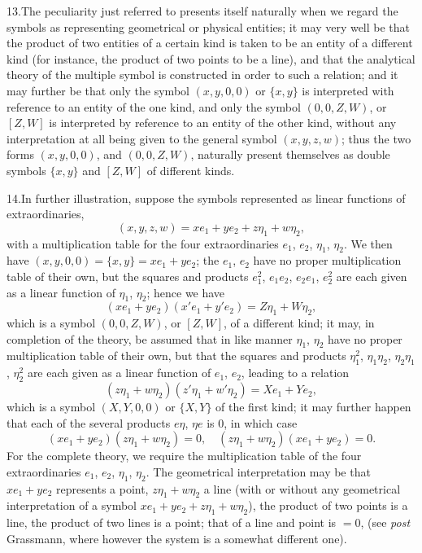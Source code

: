 \documentclass[11pt]{article}
\begin{document}
13.\quad The peculiarity just referred to presents itself naturally when we regard the symbols as representing geometrical or physical entities; it may very well be that the product of two entities of a certain kind is taken to be an entity of a different kind (for instance, the product of two points to be a line), and that the analytical theory of the multiple symbol is constructed in order to such a relation; and it may further be that only the symbol $(x, y, 0, 0)$ or $\{x, y\}$ is interpreted with reference to an entity of the one kind, and only the symbol $(0, 0, Z, W)$, or $[Z, W]$ is interpreted by reference to an entity of the other kind, without any interpretation at all being given to the general symbol $(x, y, z, w)$; thus the two forms $(x, y, 0, 0)$, and $(0, 0, Z, W)$, naturally present themselves as double symbols $\{x, y\}$ and $[Z, W]$ of different kinds.

14.\quad In further illustration, suppose the symbols represented as linear functions of extraordinaries,
\[
(x, y, z, w) = xe_{1} + ye_{2} + z\eta_{1} + w\eta_{2},
\]
with a multiplication table for the four extraordinaries $e_{1}$, $e_{2}$, $\eta_{1}$, $\eta_{2}$. We then have $(x, y, 0, 0) = \{x, y\} = xe_{1} + ye_{2}$; the $e_{1}$, $e_{2}$ have no proper multiplication table of their own, but the squares and products $e_{1}^{2}$, $e_{1}e_{2}$, $e_{2}e_{1}$, $e_{2}^{2}$ are each given as a linear function of $\eta_{1}$, $\eta_{2}$; hence we have
\[
(xe_{1} + ye_{2})(x'e_{1} + y'e_{2}) = Z\eta_{1} + W\eta_{2},
\]
which is a symbol $(0, 0, Z, W)$, or $[Z, W]$, of a different kind; it may, in completion of the theory, be assumed that in like manner $\eta_{1}$, $\eta_{2}$ have no proper multiplication table of their own, but that the squares and products $\eta_{1}^{2}$, $\eta_{1}\eta_{2}$, $\eta_{2}\eta_{1}$, $\eta_{2}^{2}$ are each given as a linear function of $e_{1}$, $e_{2}$, leading to a relation
\[
(z\eta_{1} + w\eta_{2})(z'\eta_{1} + w'\eta_{2}) = Xe_{1} + Ye_{2},
\]
which is a symbol $(X, Y, 0, 0)$ or $\{X, Y\}$ of the first kind; it may further happen that each of the several products $e\eta$, $\eta e$ is $0$, in which case
\[
(xe_{1} + ye_{2})(z\eta_{1} + w\eta_{2}) = 0,\quad (z\eta_{1} + w\eta_{2})(xe_{1} + ye_{2}) = 0.
\]
For the complete theory, we require the multiplication table of the four extraordinaries $e_{1}$, $e_{2}$, $\eta_{1}$, $\eta_{2}$. The geometrical interpretation may be that $xe_{1} + ye_{2}$ represents a point, $z\eta_{1} + w\eta_{2}$ a line (with or without any geometrical interpretation of a symbol $xe_{1} + ye_{2} + z\eta_{1} + w\eta_{2}$), the product of two points is a line, the product of two lines is a point; that of a line and point is $= 0$, (see \textit{post} Grassmann, where however the system is a somewhat different one).
\end{document}
